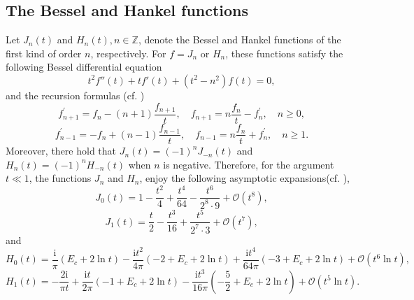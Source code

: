\documentclass[10pt,reqno,oneside]{amsart}%
\theoremstyle{definition}
\theoremstyle{remark}
\numberwithin{equation}{section}
\numberwithin{equation}{section}
\begin{document}
\subsection{The Bessel and Hankel functions}
Let $J_n(t)$ and $H_n(t),n\in\mathbb{Z}$, denote the Bessel and Hankel functions of the first kind of order $n$, respectively. For $f=J_{n}$ or $H_{n}$, these functions satisfy the following Bessel differential equation
$$
t^2f''(t)+tf'(t)+\left(t^2-n^2\right)f(t)=0,
$$
and the recursion formulas (cf. \cite{ColtonKress})
$$
f_{n+1}^{\prime}=f_{n}-(n+1) \frac{f_{n+1}}{t}, \quad f_{n+1}=n \frac{f_{n}}{t}-f_{n}^{\prime}, \quad n \geq 0,
$$
$$
f_{n-1}^{\prime}=-f_{n}+(n-1) \frac{f_{n-1}}{t}, \quad f_{n-1}=n \frac{f_{n}}{t}+f_{n}^{\prime}, \quad n \geq 1.
$$
Moreover, there hold that $J_{n}(t)=(-1)^{n} J_{-n}(t)$ and $H_{n}(t)= (-1)^{n} H_{-n}(t)$ when $n$ is negative. Therefore, for the argument $t \ll 1$, the functions $J_n$ and $H_n$, enjoy the following asymptotic expansions(cf. \cite{ColtonKress}),
\begin{equation}\label{J0}
J_0(t)=1-\frac{t^2}{4}+\frac{t^4}{64}-\frac{t^6}{2^8\cdot9}+\mathcal{O}(t^8),
\end{equation}
\begin{equation}\label{J1}
J_1(t)=\frac{t}{2}-\frac{t^3}{16}+\frac{t^5}{2^7\cdot3}+\mathcal{O}(t^7),
\end{equation}
and
\begin{equation}\label{H0}
H_0(t)=\frac{\mathrm{i}}{\pi}\left(E_c+2\ln t\right)-\frac{\mathrm{i}t^2}{4\pi}\left(-2+E_c+2\ln t\right)
+\frac{\mathrm{i}t^4}{64\pi}\left(-3+E_c+2\ln t\right)
+\mathcal{O}\left(t^6\ln t\right),
\end{equation}
\begin{equation}\label{H1}
H_1(t)=-\frac{2\mathrm{i}}{\pi t}+\frac{\mathrm{i}t}{2\pi}\left(-1+E_c+2\ln t\right)
-\frac{\mathrm{i}t^3}{16\pi}\left(-\frac{5}{2}+E_c+2\ln t\right)
+\mathcal{O}\left(t^5\ln t\right).
\end{equation}
\end{document}
